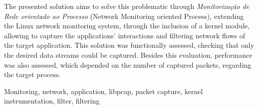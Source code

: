 The presented solution aims to solve this problematic through \textit{Monitorização de Rede orientado ao Processo} (Network Monitoring oriented Process), extending the Linux network monitoring system, through the inclusion of a kernel module, allowing to capture the applications’ interactions and filtering network flows of the target application.
This solution was functionally assessed, checking that only the desired data streams could be captured.
Besides this evaluation, performance was also assessed, which depended on the number of captured packets, regarding the target process. 



\begin{keywords}
Monitoring, network, application, libpcap, packet capture, kernel instrumentation, filter, filtering
\end{keywords} 
